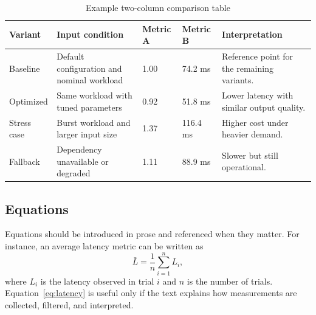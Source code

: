 \begin{table}[t]
\centering
\caption{Example two-column comparison table}
\label{tab:two-column-results}
\begin{tabular}{p{}p{}p{}p{}p{}}
\toprule
\textbf{Variant} & \textbf{Input condition} & \textbf{Metric A} & \textbf{Metric B} & \textbf{Interpretation} \\
\midrule
Baseline & Default configuration and nominal workload & 1.00 & 74.2 ms & Reference point for the remaining variants. \\
Optimized & Same workload with tuned parameters & 0.92 & 51.8 ms & Lower latency with similar output quality. \\
Stress case & Burst workload and larger input size & 1.37 & 116.4 ms & Higher cost under heavier demand. \\
Fallback & Dependency unavailable or degraded & 1.11 & 88.9 ms & Slower but still operational. \\
\bottomrule
\end{tabular}
\end{table}

\subsection{Equations}

Equations should be introduced in prose and referenced when they matter. For instance, an average latency metric can be written as
\begin{equation}
  \bar{L} = \frac{1}{n}\sum_{i=1}^{n} L_i,
  \label{eq:latency}
\end{equation}
where $L_i$ is the latency observed in trial $i$ and $n$ is the number of trials. Equation~\eqref{eq:latency} is useful only if the text explains how measurements are collected, filtered, and interpreted.
